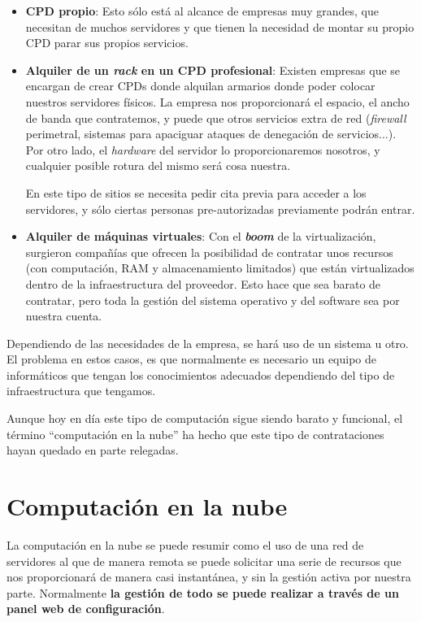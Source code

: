 \begin{itemize}
    \item \textbf{CPD propio}: Esto sólo está al alcance de empresas muy grandes, que necesitan de muchos servidores y que tienen la necesidad de montar su propio CPD parar sus propios servicios.

    \item \textbf{Alquiler de un \textit{rack} en un CPD profesional}: Existen empresas que se encargan de crear CPDs donde alquilan armarios donde poder colocar nuestros servidores físicos. La empresa nos proporcionará el espacio, el ancho de banda que contratemos, y puede que otros servicios extra de red (\textit{firewall} perimetral, sistemas para apaciguar ataques de denegación de servicios...). Por otro lado, el \textit{hardware} del servidor lo proporcionaremos nosotros, y cualquier posible rotura del mismo será cosa nuestra.

    En este tipo de sitios se necesita pedir cita previa para acceder a los servidores, y sólo ciertas personas pre-autorizadas previamente podrán entrar. 

    \item \textbf{Alquiler de máquinas virtuales}: Con el \textbf{\textit{boom}} de la virtualización, surgieron compañías que ofrecen la posibilidad de contratar unos recursos (con computación, RAM y almacenamiento limitados) que están virtualizados dentro de la infraestructura del proveedor. Esto hace que sea barato de contratar, pero toda la gestión del sistema operativo y del software sea por nuestra cuenta.
\end{itemize}


Dependiendo de las necesidades de la empresa, se hará uso de un sistema u otro. El problema en estos casos, es que normalmente es necesario un equipo de informáticos que tengan los conocimientos adecuados dependiendo del tipo de infraestructura que tengamos.

Aunque hoy en día este tipo de computación sigue siendo barato y funcional, el término “computación en la nube” ha hecho que este tipo de contrataciones hayan quedado en parte relegadas.



\chapter{Computación en la nube}

La computación en la nube se puede resumir como el uso de una red de servidores al que de manera remota se puede solicitar una serie de recursos que nos proporcionará de manera casi instantánea, y sin la gestión activa por nuestra parte. Normalmente \textbf{la gestión de todo se puede realizar a través de un panel web de configuración}.

